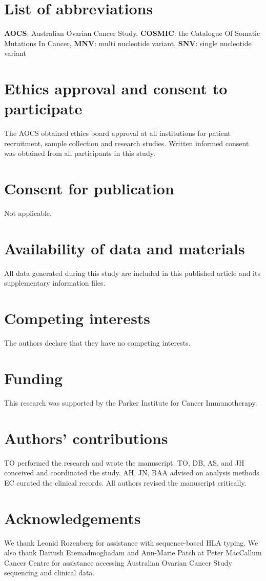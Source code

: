 \section{List of abbreviations}
\textbf{AOCS}: Australian Ovarian Cancer Study, \textbf{COSMIC}: the Catalogue Of Somatic Mutations In Cancer, \textbf{MNV}: multi nucleotide variant, \textbf{SNV}: single nucleotide variant

\section{Ethics approval and consent to participate}
The AOCS obtained ethics board approval at all institutions for patient recruitment, sample collection and research studies. Written informed consent was obtained from all participants in this study.

\section{Consent for publication}
Not applicable.

\section{Availability of data and materials}
All data generated during this study are included in this published article and its supplementary information files.

\section{Competing interests}
The authors declare that they have no competing interests.

\section{Funding}
This research was supported by the Parker Institute for Cancer Immunotherapy.

\section{Authors' contributions}
TO performed the research and wrote the manuscript. TO, DB, AS, and JH conceived and coordinated the study. AH, JN, BAA advised on analysis methods. EC curated the clinical records. All authors revised the manuscript critically.

\section{Acknowledgements}
We thank Leonid Rozenberg for assistance with sequence-based HLA typing. We also thank Dariush Etemadmoghadam and Ann-Marie Patch at Peter MacCallum Cancer Centre for assistance accessing Australian Ovarian Cancer Study sequencing and clinical data.
